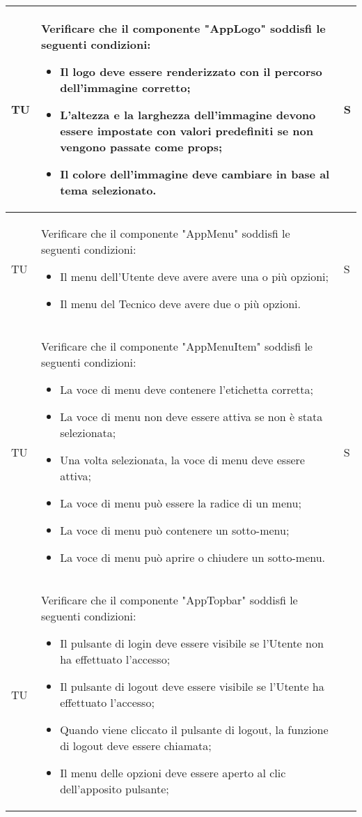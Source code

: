 \begin{adjustwidth}{-0.5cm}{-0.5cm}
\begin{longtable}{|P{1.5cm}|>{\raggedright}P{9.5cm}|>{\arraybackslash}P{1.5cm}|}
		\hline TU & Verificare che il componente "AppLogo" soddisfi le seguenti condizioni:
    \begin{itemize}
      \item Il logo deve essere renderizzato con il percorso dell'immagine corretto;
			\item L'altezza e la larghezza dell'immagine devono essere impostate con valori predefiniti se non vengono passate come props;
			\item Il colore dell'immagine deve cambiare in base al tema selezionato.
    \end{itemize} & S \\
		\hline TU & Verificare che il componente "AppMenu" soddisfi le seguenti condizioni:
    \begin{itemize}
      \item Il menu dell'Utente deve avere avere una o più opzioni;
			\item Il menu del Tecnico deve avere due o più opzioni.
    \end{itemize} & S \\
		\hline TU & Verificare che il componente "AppMenuItem" soddisfi le seguenti condizioni:
    \begin{itemize}
      \item La voce di menu deve contenere l'etichetta corretta;
			\item La voce di menu non deve essere attiva se non è stata selezionata;
			\item Una volta selezionata, la voce di menu deve essere attiva;
			\item La voce di menu può essere la radice di un menu;
			\item La voce di menu può contenere un sotto-menu;
			\item La voce di menu può aprire o chiudere un sotto-menu.
    \end{itemize} & S \\
		\hline TU & Verificare che il componente "AppTopbar" soddisfi le seguenti condizioni:
    \begin{itemize}
      \item Il pulsante di login deve essere visibile se l'Utente non ha effettuato l'accesso;
			\item Il pulsante di logout deve essere visibile se l'Utente ha effettuato l'accesso;
			\item Quando viene cliccato il pulsante di logout, la funzione di logout deve essere chiamata;
			\item Il menu delle opzioni deve essere aperto al clic dell'apposito pulsante;

\end{itemize}
\end{longtable}
\end{adjustwidth}

